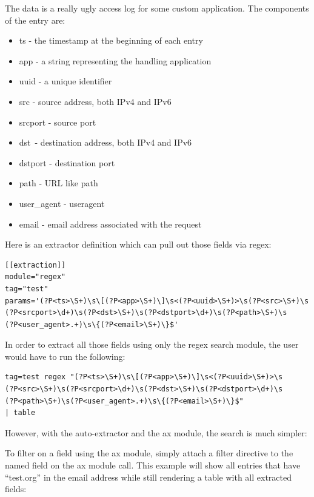 The data is a really ugly access log for some custom application. The
components of the entry are:

\begin{itemize}
\tightlist
\item
  {ts - the timestamp at the beginning of each entry}
\item
  {app - a string representing the handling application}
\item
  {uuid - a unique identifier}
\item
  {src - source address, both IPv4 and IPv6}
\item
  {srcport - source port}
\item
  {dst}{~- destination address, both IPv4 and IPv6}
\item
  {dstport - destination port}
\item
  {path - URL like path}
\item
  {user\_agent - useragent}
\item
  {email - email address associated with the request}
\end{itemize}

Here is an extractor definition which can pull out those fields via
regex:

\begin{Verbatim}[breaklines=true]
[[extraction]]
module="regex"
tag="test"
params='(?P<ts>\S+)\s\[(?P<app>\S+)\]\s<(?P<uuid>\S+)>\s(?P<src>\S+)\s
(?P<srcport>\d+)\s(?P<dst>\S+)\s(?P<dstport>\d+)\s(?P<path>\S+)\s
(?P<user_agent>.+)\s\{(?P<email>\S+)\}$'
\end{Verbatim}

In order to extract all those fields using only the regex search
module, the user would have to run the following:

\begin{Verbatim}[breaklines=true]
tag=test regex "(?P<ts>\S+)\s\[(?P<app>\S+)\]\s<(?P<uuid>\S+)>\s
(?P<src>\S+)\s(?P<srcport>\d+)\s(?P<dst>\S+)\s(?P<dstport>\d+)\s
(?P<path>\S+)\s(?P<user_agent>.+)\s\{(?P<email>\S+)\}$" 
| table
\end{Verbatim}

However, with the auto-extractor and the ax module, the search is much
simpler:


To filter on a field using the ax module, simply attach a filter
directive to the named field on the ax module call. This example will
show all entries that have ``test.org'' in the email address while still
rendering a table with all extracted fields:


